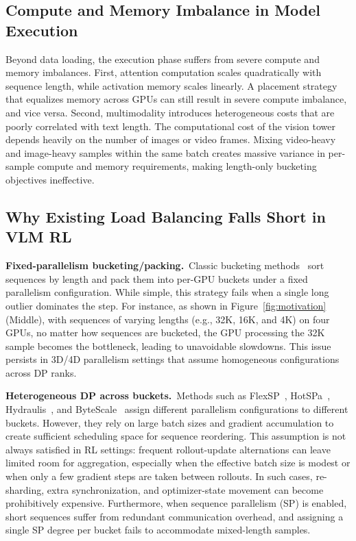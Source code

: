 \subsection{Compute and Memory Imbalance in Model Execution}

Beyond data loading, the execution phase suffers from severe compute and memory imbalances. First, attention computation scales quadratically with sequence length, while activation memory scales linearly. A placement strategy that equalizes memory across GPUs can still result in severe compute imbalance, and vice versa. Second, multimodality introduces heterogeneous costs that are poorly correlated with text length. The computational cost of the vision tower depends heavily on the number of images or video frames. Mixing video-heavy and image-heavy samples within the same batch creates massive variance in per-sample compute and memory requirements, making length-only bucketing objectives ineffective.

\subsection{Why Existing Load Balancing Falls Short in VLM RL}

\noindent\textbf{Fixed-parallelism bucketing/packing.}~Classic bucketing methods~\citep{KimiVL,KeyeVL,InternVL3_5,GLM-4_5V} sort sequences by length and pack them into per-GPU buckets under a fixed parallelism configuration. While simple, this strategy fails when a single long outlier dominates the step. For instance, as shown in Figure~\ref{fig:motivation}(Middle), with sequences of varying lengths (e.g., 32K, 16K, and 4K) on four GPUs, no matter how sequences are bucketed, the GPU processing the 32K sample becomes the bottleneck, leading to unavoidable slowdowns. This issue persists in 3D/4D parallelism settings that assume homogeneous configurations across DP ranks.

\noindent\textbf{Heterogeneous DP across buckets.}~Methods such as FlexSP~\citep{FlexSP}, HotSPa~\citep{HotSPa}, Hydraulis~\citep{Hydraulis}, and ByteScale~\citep{ByteScale} assign different parallelism configurations to different buckets. However, they rely on large batch sizes and gradient accumulation to create sufficient scheduling space for sequence reordering. This assumption is not always satisfied in RL settings: frequent rollout-update alternations can leave limited room for aggregation, especially when the effective batch size is modest or when only a few gradient steps are taken between rollouts. In such cases, re-sharding, extra synchronization, and optimizer-state movement can become prohibitively expensive. Furthermore, when sequence parallelism (SP) is enabled, short sequences suffer from redundant communication overhead, and assigning a single SP degree per bucket fails to accommodate mixed-length samples.

